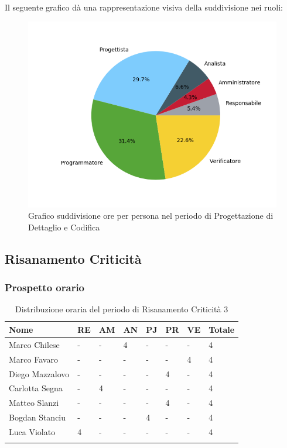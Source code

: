 Il seguente grafico dà una rappresentazione visiva della suddivisione nei ruoli:
\begin{figure}[H]
	\centering
	\includegraphics[width=0.8\linewidth]{./images/torta_pdc.png}
	\caption{Grafico suddivisione ore per persona nel periodo di Progettazione di Dettaglio e Codifica}
	\label{fig:grafico suddivione ruoli periodo pdc}
\end{figure}


\subsection{Risanamento Criticità}
\subsubsection{Prospetto orario}
\begin{longtable}{|C{.30\textwidth}|C{.06\textwidth}|C{.06\textwidth}|C{.06\textwidth} | C{.06\textwidth}| C{.06\textwidth} | C{.06\textwidth} | C{.10\textwidth} |}
	\hline
	\textbf{Nome} & \textbf{RE} & \textbf{AM} & \textbf{AN} & \textbf{PJ} & \textbf{PR} & \textbf{VE} & \textbf{Totale}\\
	\hline 
	Marco Chilese & - & - & 4 & - & - & - & 4 \\
	\hline
	Marco Favaro & - & - & - & - & - & 4 & 4 \\
	\hline
	Diego Mazzalovo & - & - & - & - & 4 & - & 4 \\
	\hline
	Carlotta Segna & - & 4 & - & - & - & - & 4 \\
	\hline
	Matteo Slanzi & - & - & - & - & 4 & - & 4 \\
	\hline
	Bogdan Stanciu & - & - & - & 4 & - & - & 4 \\
	\hline
	Luca Violato & 4 & - & - & - & - & - & 4 \\   
	\hline
	
	
	\caption{Distribuzione oraria del periodo di Risanamento Criticità 3}
	\label{Distribuzione oraria rc3}
\end{longtable}

